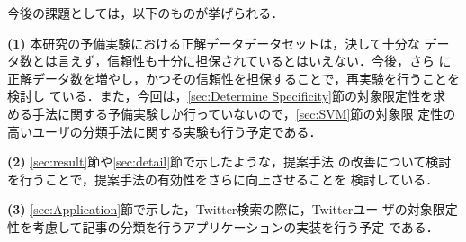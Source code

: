 今後の課題としては，以下のものが挙げられる．\vspace{1ex}

{\bf (1)} 本研究の予備実験における正解データデータセットは，決して十分な
データ数とは言えず，信頼性も十分に担保されているとはいえない．今後，さら
に正解データ数を増やし，かつその信頼性を担保することで，再実験を行うことを検討し
ている．また，今回は，\ref{sec:Determine Specificity}節の対象限定性を求
める手法に関する予備実験しか行っていないので，\ref{sec:SVM}節の対象限
定性の高いユーザの分類手法に関する実験も行う予定である．\vspace{1ex}

{\bf (2)} \ref{sec:result}節や\ref{sec:detail}節で示したような，提案手法
の改善について検討を行うことで，提案手法の有効性をさらに向上させることを
検討している．\vspace{1ex}

{\bf (3)} \ref{sec:Application}節で示した，Twitter検索の際に，Twitterユー
ザの対象限定性を考慮して記事の分類を行うアプリケーションの実装を行う予定
である．